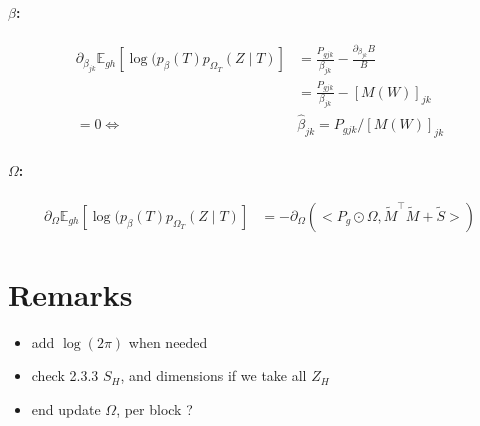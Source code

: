 \documentclass[11pt,a4paper]{article}
\newcommand{\Esp}{\mathds{E}}
\begin{document}
\paragraph{$\beta$:}
\begin{align*}
\partial_{\beta_{jk}} \Esp_{gh} [\log (p_\beta(T)p_{\Omega_T}(Z\mid T) ] &= \frac{P_{gjk}}{\beta_{jk}} - \frac{\partial_{\beta_{jk}} B }{B}\\
&=\frac{P_{gjk}}{\beta_{jk}}  - [M(W)]_{jk}\\
=0 \iff &\widehat{\beta}_{jk} = P_{gjk} / [M(W)]_{jk}
\end{align*}
\paragraph{$\Omega$:}
\begin{align*}
\partial_{\Omega} \Esp_{gh} [\log (p_\beta(T)p_{\Omega_T}(Z\mid T) ] &= -\partial_{\Omega}( <P_g \odot \Omega, \widetilde{M}^\intercal \widetilde{M} + \widetilde{S}>)
\end{align*}

\section*{Remarks}
\begin{itemize}
\item add $\log(2\pi)$ when needed
\item check 2.3.3 $S_H$, and dimensions if we take all $Z_H$
\item end update $\Omega$, per block ?
\end{itemize}

\newpage

\end{document}
